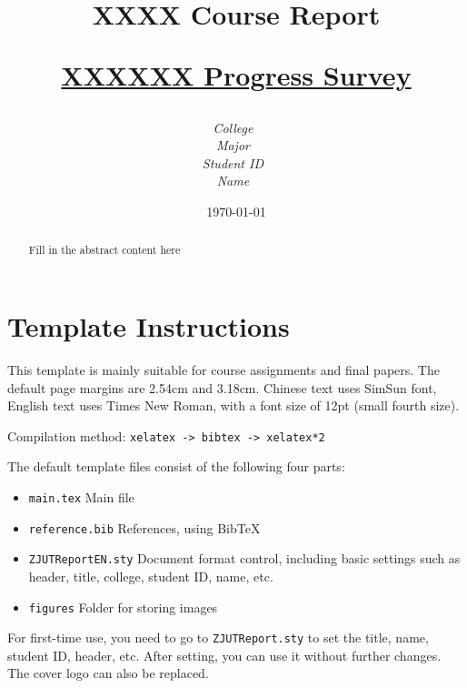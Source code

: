 \documentclass[12pt,a4paper]{article}
\title{ 
        \vspace{1cm}
        \sffamily\bfseries \Huge \textbf{{XXXX Course Report}} \par
        \vspace{1cm} 
        \sffamily\bfseries \Large {\underline{XXXXXX Progress Survey}}    
        \vspace{3cm}
    }
\author{
        \vspace{0.5cm}
        \itshape\Large College\ \dlmu[9cm]{College of Computer Science} \\ %
        \vspace{0.5cm}
        \itshape\Large Major\ \dlmu[9cm]{Computer Science and Technology} \\ %
        \vspace{0.5cm}
        \itshape\Large Student ID\ \dlmu[9cm]{2023XXXXXX} \qquad  \\ %
        \vspace{0.5cm}
        \itshape\Large Name\ \dlmu[9cm]{XXX} \qquad \\ %
    }
\date{\today} %
\begin{document}
\cover
\thispagestyle{empty} %
\newpage
\begin{abstract}

Fill in the abstract content here

\end{abstract}

\thispagestyle{empty} %

\newpage
\tableofcontents

\newpage
\setcounter{page}{1} %


\section{Template Instructions}
This template is mainly suitable for course assignments and final papers. The default page margins are 2.54cm and 3.18cm. Chinese text uses SimSun font, English text uses Times New Roman, with a font size of 12pt (small fourth size).

Compilation method: \verb|xelatex -> bibtex -> xelatex*2|


The default template files consist of the following four parts:
\begin{itemize}
    \item \texttt{main.tex} Main file
    \item \texttt{reference.bib} References, using BibTeX
    \item \texttt{ZJUTReportEN.sty} Document format control, including basic settings such as header, title, college, student ID, name, etc.
    \item \texttt{figures} Folder for storing images
\end{itemize}

For first-time use, you need to go to \texttt{ZJUTReport.sty} to set the title, name, student ID, header, etc. After setting, you can use it without further changes. The cover logo can also be replaced.
\end{document}
